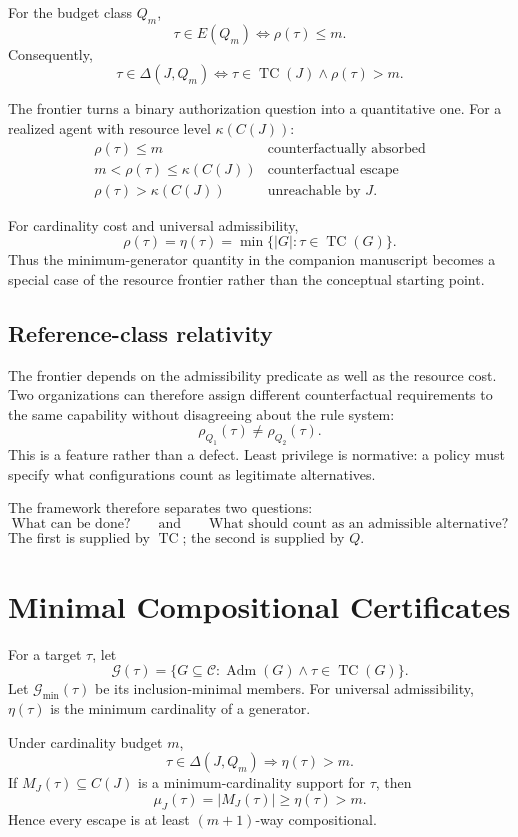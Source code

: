 \documentclass[11pt]{article}
\newcommand{\TC}{\operatorname{TC}}
\newcommand{\Adm}{\operatorname{Adm}}
\newcommand{\rhoCF}{\rho}
\newcommand{\etaMin}{\eta}
\newcommand{\Cset}{\mathcal C}
\begin{document}
For the budget class $Q_m$,
\[
\boxed{
\tau\in E(Q_m)\iff \rhoCF(\tau)\le m.
}
\]
Consequently,
\[
\boxed{
\tau\in\Delta(J,Q_m)
\iff
\tau\in\TC(J)\land\rhoCF(\tau)>m.
}
\]

The frontier turns a binary authorization question into a quantitative one. For a realized agent with resource level $\kappa(C(J))$:
\[
\begin{array}{c|c}
\rhoCF(\tau)\le m & \text{counterfactually absorbed}\\
m<\rhoCF(\tau)\le\kappa(C(J)) & \text{counterfactual escape}\\
\rhoCF(\tau)>\kappa(C(J)) & \text{unreachable by }J.
\end{array}
\]

For cardinality cost and universal admissibility,
\[
\rhoCF(\tau)=\etaMin(\tau)
=\min\{|G|:\tau\in\TC(G)\}.
\]
Thus the minimum-generator quantity in the companion manuscript becomes a special case of the resource frontier rather than the conceptual starting point.

\subsection{Reference-class relativity}

The frontier depends on the admissibility predicate as well as the resource cost. Two organizations can therefore assign different counterfactual requirements to the same capability without disagreeing about the rule system:
\[
\rhoCF_{Q_1}(\tau)\neq\rhoCF_{Q_2}(\tau).
\]
This is a feature rather than a defect. Least privilege is normative: a policy must specify what configurations count as legitimate alternatives.

The framework therefore separates two questions:
\[
\text{What can be done?}
\qquad\text{and}\qquad
\text{What should count as an admissible alternative?}
\]
The first is supplied by $\TC$; the second is supplied by $Q$.

\section{Minimal Compositional Certificates}

For a target $\tau$, let
\[
\mathcal G(\tau)=
\{G\subseteq\Cset:\Adm(G)\land\tau\in\TC(G)\}.
\]
Let $\mathcal G_{\min}(\tau)$ be its inclusion-minimal members. For universal admissibility, $\etaMin(\tau)$ is the minimum cardinality of a generator.

Under cardinality budget $m$,
\[
\tau\in\Delta(J,Q_m)
\Longrightarrow
\etaMin(\tau)>m.
\]
If $M_J(\tau)\subseteq C(J)$ is a minimum-cardinality support for $\tau$, then
\[
\mu_J(\tau)=|M_J(\tau)|\ge \etaMin(\tau)>m.
\]
Hence every escape is at least $(m+1)$-way compositional.
\end{document}
